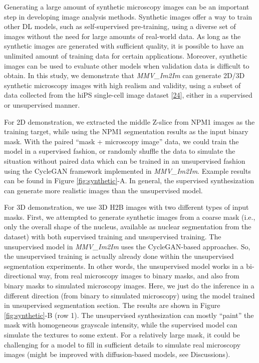 Generating a large amount of synthetic microscopy images can be an important step in developing image analysis methods. Synthetic images offer a way to train other DL models, such as self-supervised pre-training, using a diverse set of images without the need for large amounts of real-world data. As long as the synthetic images are generated with sufficient quality, it is possible to have an unlimited amount of training data for certain applications. Moreover, synthetic images can be used to evaluate other models when validation data is difficult to obtain. In this study, we demonstrate that \emph{MMV\_Im2Im} can generate 2D/3D synthetic microscopy images with high realism and validity, using a subset of data collected from the hiPS single-cell image dataset {[}\protect\hyperlink{ref-5sGcmDuy}{24}{]}, either in a supervised or unsupervised manner.

For 2D demonstration, we extracted the middle Z-slice from NPM1 images as the training target, while using the NPM1 segmentation results as the input binary mask. With the paired ``mask + microscopy image'' data, we could train the model in a supervised fashion, or randomly shuffle the data to simulate the situation without paired data which can be trained in an unsupervised fashion using the CycleGAN framework implemented in \emph{MMV\_Im2Im}. Example results can be found in Figure \ref{fig:synthetic}-A. In general, the supervised synthesization can generate more realistic images than the unsupervised model.

For 3D demonstration, we use 3D H2B images with two different types of input masks. First, we attempted to generate synthetic images from a coarse mask (i.e., only the overall shape of the nucleus, available as nuclear segmentation from the dataset) with both supervised training and unsupervised training. The unsupervised model in \emph{MMV\_Im2Im} uses the CycleGAN-based approaches. So, the unsupervised training is actually already done within the unsupervised segmentation experiments. In other words, the unsupervised model works in a bi-directional way, from real microscopy images to binary masks, and also from binary masks to simulated microscopy images. Here, we just do the inference in a different direction (from binary to simulated microscopy) using the model trained in unsupervised segmentation section. The results are shown in Figure \ref{fig:synthetic}-B (row 1). The unsupervised synthesization can mostly ``paint'' the mask with homogeneous grayscale intensity, while the supervised model can simulate the textures to some extent. For a relatively large mask, it could be challenging for a model to fill in sufficient details to simulate real microscopy images (might be improved with diffusion-based models, see Discussions).

